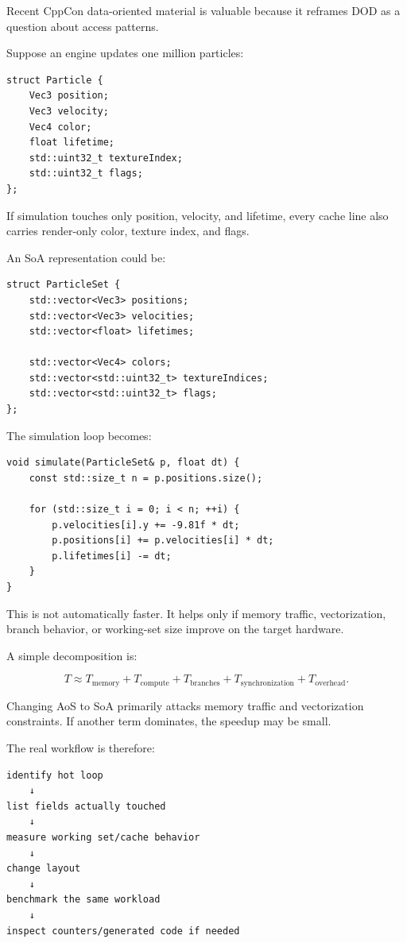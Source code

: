 \hypertarget{01-foundations-i-ch005-data-oriented-design-begins-with-the-loop-not-with-a-fashionable-container}{}

Recent CppCon data-oriented material is valuable because it reframes DOD as a question about access patterns.

Suppose an engine updates one million particles:

\begin{verbatim}
struct Particle {
    Vec3 position;
    Vec3 velocity;
    Vec4 color;
    float lifetime;
    std::uint32_t textureIndex;
    std::uint32_t flags;
};
\end{verbatim}

If simulation touches only position, velocity, and lifetime, every cache line also carries render-only color, texture index, and flags.

An SoA representation could be:

\begin{verbatim}
struct ParticleSet {
    std::vector<Vec3> positions;
    std::vector<Vec3> velocities;
    std::vector<float> lifetimes;

    std::vector<Vec4> colors;
    std::vector<std::uint32_t> textureIndices;
    std::vector<std::uint32_t> flags;
};
\end{verbatim}

The simulation loop becomes:

\begin{verbatim}
void simulate(ParticleSet& p, float dt) {
    const std::size_t n = p.positions.size();

    for (std::size_t i = 0; i < n; ++i) {
        p.velocities[i].y += -9.81f * dt;
        p.positions[i] += p.velocities[i] * dt;
        p.lifetimes[i] -= dt;
    }
}
\end{verbatim}

This is not automatically faster. It helps only if memory traffic, vectorization, branch behavior, or working-set size improve on the target hardware.

A simple decomposition is:

\[
T
\approx
T_{\text{memory}}
+
T_{\text{compute}}
+
T_{\text{branches}}
+
T_{\text{synchronization}}
+
T_{\text{overhead}}.
\]

Changing AoS to SoA primarily attacks memory traffic and vectorization constraints. If another term dominates, the speedup may be small.

The real workflow is therefore:

\begin{verbatim}
identify hot loop
    ↓
list fields actually touched
    ↓
measure working set/cache behavior
    ↓
change layout
    ↓
benchmark the same workload
    ↓
inspect counters/generated code if needed
\end{verbatim}

